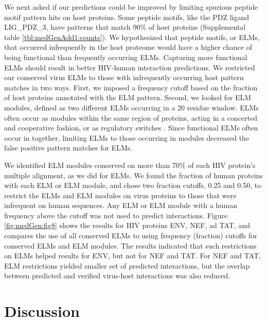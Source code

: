 We next asked if our predictions could be improved by limiting
spurious peptide motif pattern hits on host proteins. Some peptide
motifs, like the PDZ ligand LIG\_PDZ\_3, have patterns that match 90\%
of host proteins (Supplemental table \ref{tbl:medGenAdd1:counts}). We
hypothesized that peptide motifs, or ELMs, that occurred infrequently
in the host proteome would have a higher chance of being functional
than frequently occurring ELMs. Capturing more functional ELMs should
result in better HIV-human interaction predictions. We restricted our
conserved virus ELMs to those with infrequently occurring host pattern
matches in two ways. First, we imposed a frequency cutoff based on the
fraction of host proteins annotated with the ELM pattern. Second, we
looked for ELM modules, defined as two different ELMs occurring in a
20 residue window. ELMs often occur as modules within the same region
of proteins, acting in a concerted and cooperative fashion, or as
regulatory switches \cite{gould2010elm}. Since functional ELMs often
occur in together, limiting ELMs to those occurring in modules
decreased the false positive pattern matches for ELMs. 

We identified ELM modules conserved on more than 70\% of each HIV
protein's multiple alignment, as we did for ELMs. We found the
fraction of human proteins with each ELM or ELM module, and chose two
fraction cutoffs, 0.25 and 0.50, to restrict the ELMs and ELM modules
on virus proteins to those that were infrequent on human
sequences. Any ELM or ELM module with a human frequency above the
cutoff was not used to predict interactions. Figure
\ref{fig:medGen:fig8} shows the results for HIV proteins ENV, NEF, ad
TAT, and compares the use of all conserved ELMs to using frequency
(fraction) cutoffs for conserved ELMs and ELM modules. The results
indicated that such restrictions on ELMs helped results for ENV, but
not for NEF and TAT. For NEF and TAT, ELM restrictions yielded smaller
set of predicted interactions, but the overlap between predicted and
verified virus-host interactions was also reduced.

\section{Discussion}

